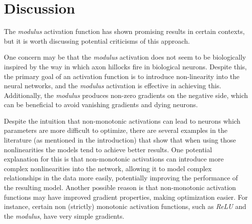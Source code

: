 \documentclass[authoryear]{elsarticle}
\begin{document}
\section{Discussion}

The \textit{modulus} activation function has shown promising results in certain contexts, but it is worth discussing potential criticisms of this approach.




One concern may be that the \textit{modulus} activation does not seem to be biologically inspired by the way in which axon hillocks fire in biological neurons. Despite this, the primary goal of an activation function is to introduce non-linearity into the neural networks, and the \textit{modulus} activation is effective in achieving this. Additionally, the \textit{modulus} produces non-zero gradients on the negative side, which can be beneficial to avoid vanishing gradients and dying neurons. 



Despite the intuition that non-monotonic activations can lead to neurons which parameters are more difficult to optimize, there are several examples in the literature (as mentioned in the introduction) that show that when using those nonlinearities the models tend to achieve better results. One potential explanation for this is that non-monotonic activations can introduce more complex nonlinearities into the network, allowing it to model complex relationships in the data more easily, potentially improving the performance of the resulting model. Another possible reason is that non-monotonic activation functions may have improved gradient properties, making optimization easier. For instance, certain non (strictly) monotonic activation functions, such as \textit{ReLU} and the \textit{modulus}, have very simple gradients.
\end{document}
